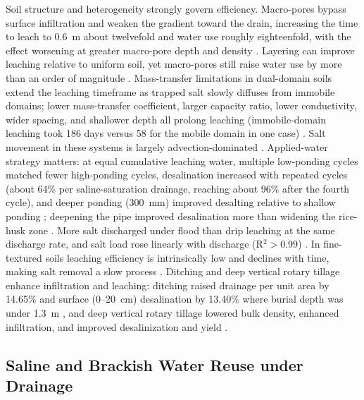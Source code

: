 Soil structure and heterogeneity strongly govern efficiency. Macro-pores bypass surface infiltration and weaken the gradient toward the drain, increasing the time to leach to 0.6~m about twelvefold and water use roughly eighteenfold, with the effect worsening at greater macro-pore depth and density \parencite{Xin2016}. Layering can improve leaching relative to uniform soil, yet macro-pores still raise water use by more than an order of magnitude \parencite{Xin2016}. Mass-transfer limitations in dual-domain soils extend the leaching timeframe as trapped salt slowly diffuses from immobile domains; lower mass-transfer coefficient, larger capacity ratio, lower conductivity, wider spacing, and shallower depth all prolong leaching (immobile-domain leaching took 186 days versus 58 for the mobile domain in one case) \parencite{Zhang2024}. Salt movement in these systems is largely advection-dominated \parencite{Yu2018}. Applied-water strategy matters: at equal cumulative leaching water, multiple low-ponding cycles matched fewer high-ponding cycles, desalination increased with repeated cycles (about 64\% per saline-saturation drainage, reaching about 96\% after the fourth cycle), and deeper ponding (300~mm) improved desalting relative to shallow ponding \parencite{Jia2023}; deepening the pipe improved desalination more than widening the rice-husk zone \parencite{Jia2023}. More salt discharged under flood than drip leaching at the same discharge rate, and salt load rose linearly with discharge (R$^2>0.99$) \parencite{Li2022}. In fine-textured soils leaching efficiency is intrinsically low and declines with time, making salt removal a slow process \parencite{MANN1982}. Ditching and deep vertical rotary tillage enhance infiltration and leaching: ditching raised drainage per unit area by 14.65\% and surface (0--20~cm) desalination by 13.40\% where burial depth was under 1.3~m \parencite{Tian2023}, and deep vertical rotary tillage lowered bulk density, enhanced infiltration, and improved desalinization and yield \parencite{Li2026}.

\subsection{Saline and Brackish Water Reuse under Drainage}

